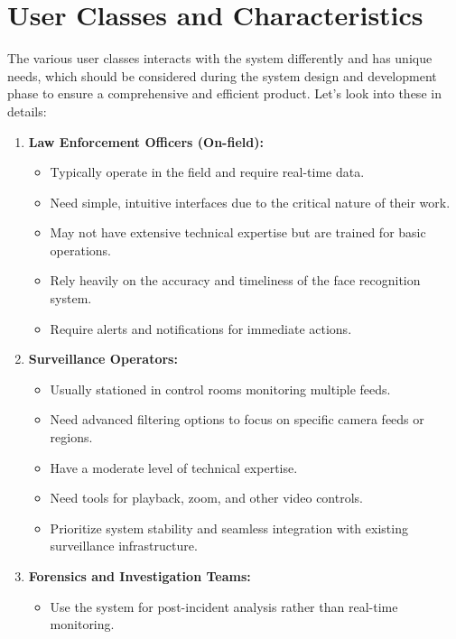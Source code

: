 \documentclass{scrreprt}
\begin{document}
    \section{User Classes and Characteristics}
        The various user classes interacts with the system differently and has unique needs, which should be considered during the system design and development phase to ensure a comprehensive and efficient product.      Let's look into these in details:
        \begin{enumerate}
            \item \textbf{Law Enforcement Officers (On-field):}
                \begin{itemize}
                    \item Typically operate in the field and require real-time data.
                    \item Need simple, intuitive interfaces due to the critical nature of their work.
                    \item May not have extensive technical expertise but are trained for basic operations.
                    \item Rely heavily on the accuracy and timeliness of the face recognition system.
                    \item Require alerts and notifications for immediate actions.     
                \end{itemize}
            \item \textbf{Surveillance Operators:}
                \begin{itemize}
                    \item Usually stationed in control rooms monitoring multiple feeds.
                    \item Need advanced filtering options to focus on specific camera feeds or regions.
                    \item Have a moderate level of technical expertise.
                    \item Need tools for playback, zoom, and other video controls.
                    \item Prioritize system stability and seamless integration with existing surveillance infrastructure.    
                \end{itemize}
            \item \textbf{Forensics and Investigation Teams:}
                \begin{itemize}
                    \item Use the system for post-incident analysis rather than real-time monitoring.

\end{itemize}
\end{enumerate}
\end{document}
